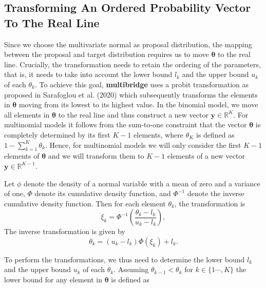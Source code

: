 \clearpage
\makeatletter
\efloat@restorefloats
\makeatother


\begin{appendix}
\hypertarget{transforming-an-ordered-probability-vector-to-the-real-line}{%
\section{Transforming An Ordered Probability Vector To The Real
Line}\label{transforming-an-ordered-probability-vector-to-the-real-line}}

Since we choose the multivariate normal as proposal distribution, the
mapping between the proposal and target distribution requires us to move
\(\boldsymbol{\theta}\) to the real line. Crucially, the transformation
needs to retain the ordering of the parameters, that is, it needs to
take into account the lower bound \(l_k\) and the upper bound \(u_k\) of
each \(\theta_k\). To achieve this goal, \textbf{multibridge} uses a
probit transformation as proposed in Sarafoglou et al. (2020) which
subsequently transforms the elements in \(\boldsymbol{\theta}\) moving
from its lowest to its highest value. In the binomial model, we move all
elements in \(\boldsymbol{\theta}\) to the real line and thus construct
a new vector \(\boldsymbol{y} \in \mathbb{R}^{K}\). For multinomial
models it follows from the sum-to-one constraint that the vector
\(\boldsymbol{\theta}\) is completely determined by its first \(K - 1\)
elements, where \(\theta_K\) is defined as
\(1 - \sum_{k = 1}^K \theta_k\). Hence, for multinomial models we will
only consider the first \(K - 1\) elements of \(\boldsymbol{\theta}\)
and we will transform them to \(K - 1\) elements of a new vector
\(\boldsymbol{y} \in \mathbb{R}^{K - 1}\).

Let \(\phi\) denote the density of a normal variable with a mean of zero
and a variance of one, \(\Phi\) denote its cumulative density function,
and \(\Phi^{-1}\) denote the inverse cumulative density function. Then
for each element \(\theta_k\), the transformation is
\[\xi_k = \Phi^{-1}\left(\frac{\theta_k - l_k}{u_k - l_k}\right),\] The
inverse transformation is given by
\[\theta_k = (u_k - l_k) \Phi(\xi_k) + l_k.\]

To perform the transformations, we thus need to determine the lower
bound \(l_k\) and the upper bound \(u_k\) of each \(\theta_k\). Assuming
\(\theta_{k-1} < \theta_{k}\) for \(k \in \{1 \cdots, K\}\) the lower
bound for any element in \(\boldsymbol{\theta}\) is defined as


\end{appendix}
